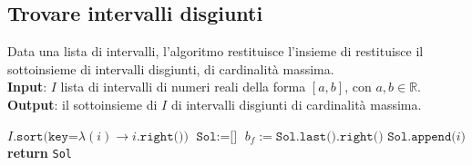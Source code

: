 \documentclass[14pt]{extreport}
\theoremstyle{definition}
\theoremstyle{definition}
\begin{document}
\subsection{Trovare intervalli disgiunti}

\begin{algorithm}[H]
    \caption{
        Data una lista di intervalli, l'algoritmo restituisce l'insieme di restituisce il sottoinsieme di intervalli disgiunti, di cardinalità massima.\\
        \textbf{Input}: $I$ lista di intervalli di numeri reali della forma $[a, b]$, con $a, b \in \mathbb{R}$.\\
        \textbf{Output}: il sottoinsieme di $I$ di intervalli disgiunti di cardinalità massima.
    }

    \begin{algorithmic}[1]
            \State $I\texttt{.sort(key=}\lambda (i) \rightarrow i\texttt{.right())}$ 
            \State $\texttt{Sol}:= \texttt{[]}$
                \State $b_f := \texttt{Sol.last().right()}$ 
                    \State $\texttt{Sol.append(}i\texttt{)}$
                \EndIf
            \EndFor
            \State \textbf{return} \texttt{Sol}
        \EndFunction
    \end{algorithmic}
\end{algorithm}
\end{document}
